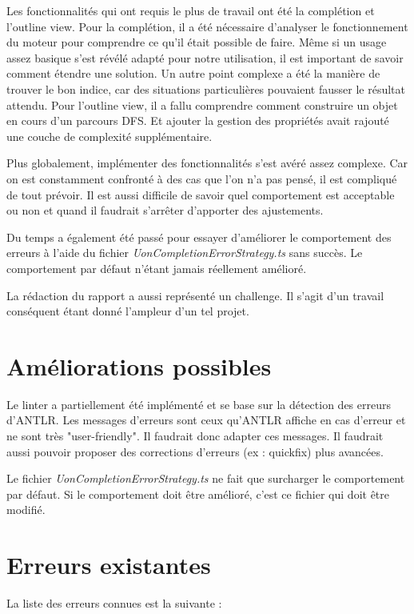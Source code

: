 \documentclass[
    iict, %
    il, %
]{heig-tb}
\begin{document}
Les fonctionnalités qui ont requis le plus de travail ont été la complétion et l'outline view.
Pour la complétion, il a été nécessaire d'analyser le fonctionnement du moteur pour comprendre ce qu'il était possible de faire.
Même si un usage assez basique s'est révélé adapté pour notre utilisation, il est important de savoir comment étendre une solution.
Un autre point complexe a été la manière de trouver le bon indice, car des situations particulières pouvaient fausser le résultat attendu.
Pour l'outline view, il a fallu comprendre comment construire un objet en cours d'un parcours DFS. Et ajouter la gestion des propriétés avait rajouté une couche de complexité supplémentaire.

Plus globalement, implémenter des fonctionnalités s'est avéré assez complexe. Car on est constamment confronté à des cas que l'on n’a pas pensé, il est compliqué de tout prévoir.
Il est aussi difficile de savoir quel comportement est acceptable ou non et quand il faudrait s'arrêter d'apporter des ajustements.

Du temps a également été passé pour essayer d'améliorer le comportement des erreurs à l'aide du fichier \emph{UonCompletionErrorStrategy.ts} sans succès. Le comportement par défaut n'étant jamais réellement amélioré.

La rédaction du rapport a aussi représenté un challenge. Il s'agit d'un travail conséquent étant donné l'ampleur d'un tel projet.

\section{Améliorations possibles}

Le linter a partiellement été implémenté et se base sur la détection des erreurs d'ANTLR.
Les messages d'erreurs sont ceux qu'ANTLR affiche en cas d'erreur et ne sont très "user-friendly". Il faudrait donc adapter ces messages.
Il faudrait aussi pouvoir proposer des corrections d'erreurs (ex : quickfix) plus avancées.

Le fichier \emph{UonCompletionErrorStrategy.ts} ne fait que surcharger le comportement par défaut. Si le comportement doit être amélioré, c'est ce fichier qui doit être modifié.

\section{Erreurs existantes}

La liste des erreurs connues est la suivante :
\end{document}
